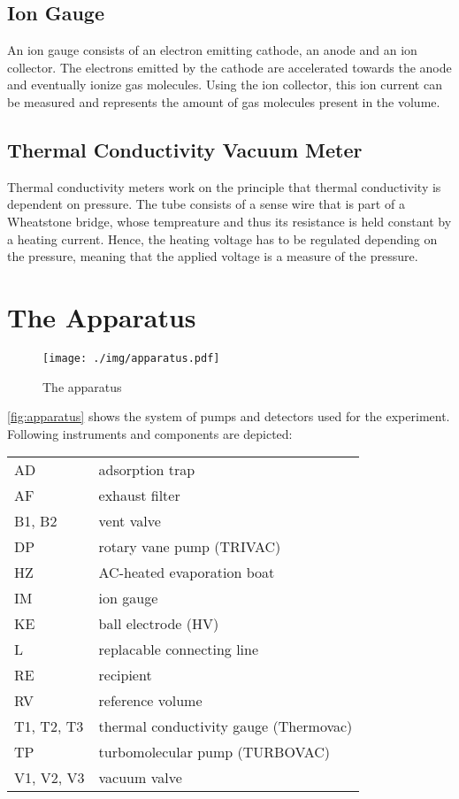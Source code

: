 \subsection{Ion Gauge}
An ion gauge consists of an electron emitting cathode, an anode and an ion collector.
The electrons emitted by the cathode are accelerated towards the anode and eventually ionize gas molecules.
Using the ion collector, this ion current can be measured and represents the amount of gas molecules present in the volume.

\subsection{Thermal Conductivity Vacuum Meter}
Thermal conductivity meters work on the principle that thermal conductivity is dependent on pressure.
The tube consists of a sense wire that is part of a Wheatstone bridge, whose tempreature and thus its resistance is held constant by a heating current.
Hence, the heating voltage has to be regulated depending on the pressure, meaning that the applied voltage is a measure of the pressure.

\section{The Apparatus}
\begin{figure}[tbp]
	\centering
	\texttt{[image: ./img/apparatus.pdf]}
	\caption[The apparatus]{The apparatus}
	\label{fig:apparatus}
\end{figure}
\autoref{fig:apparatus} shows the system of pumps and detectors used for the experiment. Following instruments and components are depicted:
\begin{center}
	\begin{tabular}{ll}
		AD & adsorption trap	\\
		AF & exhaust filter	\\
		B1, B2 & vent valve\\
		DP & rotary vane pump (TRIVAC)	\\
		HZ & AC-heated evaporation boat	\\
		IM & ion gauge	\\
		KE & ball electrode (HV)	\\
		L & replacable connecting line	\\
		RE & recipient	\\
		RV & reference volume	\\
		T1, T2, T3 & thermal conductivity gauge (Thermovac)	\\
		TP & turbomolecular pump (TURBOVAC)	\\
		V1, V2, V3 & vacuum valve	\\
	\end{tabular}
\end{center}

